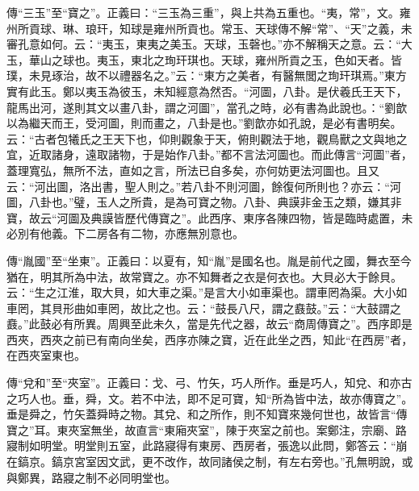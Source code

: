 {\noindent\zhuan{}\fzbyks 傳“三玉”至“寶之”。正義曰：“三玉為三重”，與上共為五重也。“夷，常”，文。雍州所貢球、琳、琅玕，知球是雍州所貢也。常玉、天球傳不解“常”、“天”之義，未審孔意如何。云：“夷玉，東夷之美玉。天球，玉磬也。”亦不解稱天之意。云：“大玉，華山之球也。夷玉，東北之珣玕琪也。天球，雍州所貢之玉，色如天者。皆璞，未見琢治，故不以禮器名之。”云：“東方之美者，有醫無閭之珣玕琪焉。”東方實有此玉。鄭以夷玉為彼玉，未知經意為然否。“河圖，八卦。是伏羲氏王天下，龍馬出河，遂則其文以畫八卦，謂之河圖”，當孔之時，必有書為此說也。：“劉歆以為繼天而王，受河圖，則而畫之，八卦是也。”劉歆亦如孔說，是必有書明矣。云：“古者包犧氏之王天下也，仰則觀象于天，俯則觀法于地，觀鳥獸之文與地之宜，近取諸身，遠取諸物，于是始作八卦。”都不言法河圖也。而此傳言“河圖”者，蓋理寬弘，無所不法，直如之言，所法已自多矣，亦何妨更法河圖也。且又云：“河出圖，洛出書，聖人則之。”若八卦不則河圖，餘復何所則也？亦云：“河圖，八卦也。”璧，玉人之所貴，是為可寶之物。八卦、典謨非金玉之類，嫌其非寶，故云“河圖及典謨皆歷代傳寶之”。此西序、東序各陳四物，皆是臨時處置，未必別有他義。下二房各有二物，亦應無別意也。 \par}

{\noindent\zhuan{}\fzbyks 傳“胤國”至“坐東”。正義曰：以夏有，知“胤”是國名也。胤是前代之國，舞衣至今猶在，明其所為中法，故常寶之。亦不知舞者之衣是何衣也。大貝必大于餘貝。云：“生之江淮，取大貝，如大車之渠。”是言大小如車渠也。謂車罔為渠。大小如車罔，其貝形曲如車罔，故比之也。云：“鼓長八尺，謂之鼖鼓。”云：“大鼓謂之鼖。”此鼓必有所異。周興至此未久，當是先代之器，故云“商周傳寶之”。西序即是西夾，西夾之前已有南向坐矣，西序亦陳之寶，近在此坐之西，知此“在西房”者，在西夾室東也。 \par}

{\noindent\zhuan{}\fzbyks 傳“兌和”至“夾室”。正義曰：戈、弓、竹矢，巧人所作。垂是巧人，知兌、和亦古之巧人也。垂，舜，文。若不中法，即不足可寶，知“所為皆中法，故亦傳寶之”。垂是舜之，竹矢蓋舜時之物。其兌、和之所作，則不知寶來幾何世也，故皆言“傳寶之”耳。東夾室無坐，故直言“東廂夾室”，陳于夾室之前也。案鄭注，宗廟、路寢制如明堂。明堂則五室，此路寢得有東房、西房者，張逸以此問，鄭答云：“崩在鎬京。鎬京宮室因文武，更不改作，故同諸侯之制，有左右旁也。”孔無明說，或與鄭異，路寢之制不必同明堂也。 \par}

